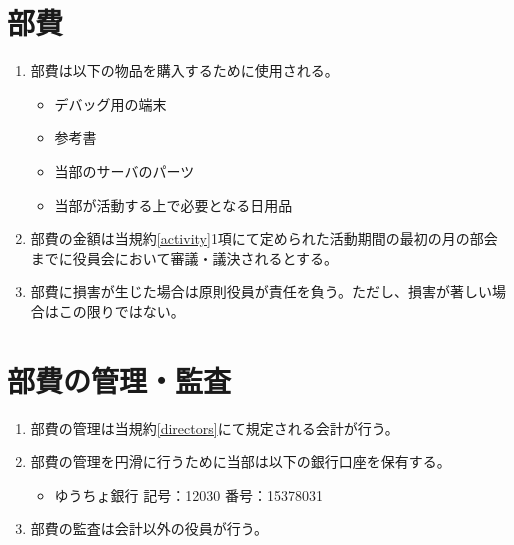 \documentclass[12pt, unicode, a4paper]{ltjsreport}
\begin{document}
    \section{部費}\label{budget}
        \begin{enumerate}
            \item 部費は以下の物品を購入するために使用される。
            \begin{itemize}
                \item デバッグ用の端末
                \item 参考書
                \item 当部のサーバのパーツ
                \item 当部が活動する上で必要となる日用品
            \end{itemize}
            \item 部費の金額は当規約\ref{activity}1項にて定められた活動期間の最初の月の部会までに役員会において審議・議決されるとする。
            \item 部費に損害が生じた場合は原則役員が責任を負う。ただし、損害が著しい場合はこの限りではない。
        \end{enumerate}

    \section{部費の管理・監査}
        \begin{enumerate}
            \item 部費の管理は当規約\ref{directors}にて規定される会計が行う。
            \item 部費の管理を円滑に行うために当部は以下の銀行口座を保有する。
            \begin{itemize}
                \item ゆうちょ銀行 記号：12030 番号：15378031
            \end{itemize}
            \item 部費の監査は会計以外の役員が行う。
        \end{enumerate}
\end{document}
